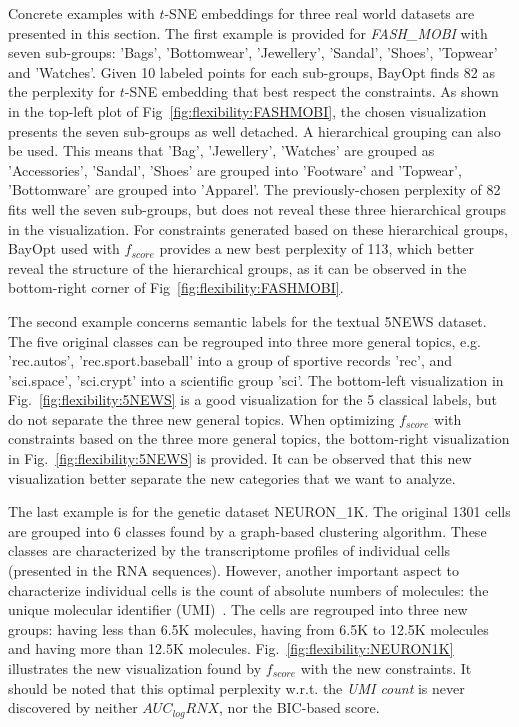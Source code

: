 Concrete examples with $t$-SNE embeddings for three real world datasets are presented in this section.
The first example is provided for \emph{FASH\_MOBI} with seven sub-groups: 'Bags', 'Bottomwear', 'Jewellery', 'Sandal', 'Shoes', 'Topwear' and 'Watches'.
Given 10 labeled points for each sub-groups, BayOpt finds 82 as the perplexity for $t$-SNE embedding that best respect the constraints.
As shown in the top-left plot of Fig~\ref{fig:flexibility:FASHMOBI}, the chosen visualization presents the seven sub-groups as well detached.
A hierarchical grouping can also be used. This means that 'Bag', 'Jewellery', 'Watches' are grouped as 'Accessories', 'Sandal', 'Shoes' are grouped into 'Footware' and 'Topwear', 'Bottomware' are grouped into 'Apparel'.
The previously-chosen perplexity of 82 fits well the seven sub-groups, but does not reveal these three hierarchical groups in the visualization.
For constraints generated based on these hierarchical groups, BayOpt used with $f_{score}$ provides a new best perplexity of 113, which better reveal the structure of the hierarchical groups, as it can be observed in the bottom-right corner of Fig~\ref{fig:flexibility:FASHMOBI}.

The second example concerns semantic labels for the textual 5NEWS dataset.
The five original classes can be regrouped into three more general topics, e.g. 'rec.autos', 'rec.sport.baseball' into a group of sportive records 'rec', and 'sci.space', 'sci.crypt' into a scientific group 'sci'. The bottom-left visualization in Fig.~\ref{fig:flexibility:5NEWS} is a good visualization for the 5 classical labels, but do not separate the three new general topics. When optimizing $f_{score}$ with constraints based on the three more general topics, the bottom-right visualization in Fig.~\ref{fig:flexibility:5NEWS} is provided. It can be observed that this new visualization better separate the new categories that we want to analyze.

The last example is for the genetic dataset NEURON\_1K.
The original 1301 cells are grouped into 6 classes found by a graph-based clustering algorithm.
These classes are characterized by the transcriptome profiles of individual cells (presented in the RNA sequences).
However, another important aspect to characterize individual cells is the count of absolute numbers of molecules: the unique molecular identifier (UMI)~\cite{kivioja2011counting}. 
The cells are regrouped into three new groups: having less than 6.5K molecules, having from 6.5K to 12.5K molecules and having more than 12.5K molecules.
Fig.~\ref{fig:flexibility:NEURON1K} illustrates the new visualization found by $f_{score}$ with the new constraints.
It should be noted that this optimal perplexity w.r.t. the \emph{UMI count} is never discovered by neither $AUC_{log}RNX$, nor the BIC-based score.

